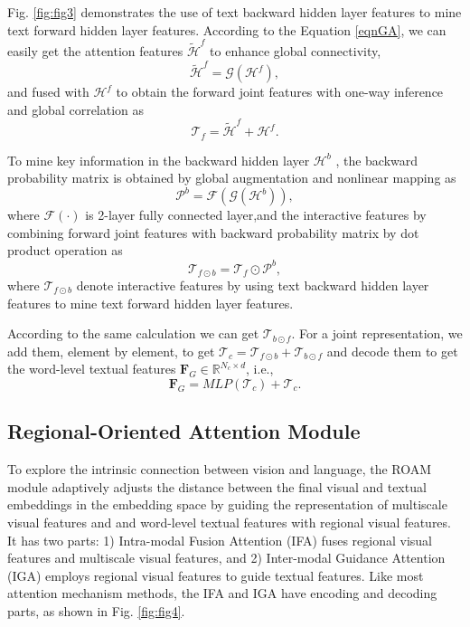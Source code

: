 \documentclass[journal]{IEEEtran}
\begin{document}
Fig. \ref{fig:fig3} demonstrates the use of text backward hidden layer features to mine text forward hidden layer features. According to the Equation \ref{eqnGA}, we can easily get the attention features $\tilde{\bm{\mathcal{H}}}^f$ to enhance global connectivity,
\begin{equation}
\tilde{\bm{\mathcal{H}}}^f = \bm{\mathcal{G}}(\bm{\mathcal{H}}^f),
\end{equation}
and fused with $\bm{\mathcal{H}}^f$ to obtain the forward joint features with one-way inference and global correlation as
\begin{equation}
\bm{\mathcal{T}}_f = \tilde{\bm{\mathcal{H}}}^f + \bm{\mathcal{H}}^f.
\end{equation}

To mine key information in the backward hidden layer $\bm{\mathcal{H}}^b$ , the backward probability matrix is obtained by global augmentation and nonlinear mapping as
\begin{equation}
\bm{\mathcal{P}}^b = \bm{\mathcal{F}}( \bm{\mathcal{G}}(\bm{\mathcal{H}}^b) ),
\end{equation}
where $\bm{\mathcal{F}}(\cdot)$ is 2-layer fully connected layer,and the interactive features by combining forward joint features with backward probability matrix by dot product operation as
\begin{equation}
\bm{\mathcal{T}}_{f\odot b}=\bm{\mathcal{T}}_f \odot \bm{\mathcal{P}}^b,
\end{equation}
where $\bm{\mathcal{T}}_{f\odot b}$ denote interactive features by using text backward hidden layer features to mine text forward hidden layer features.

According to the same calculation we can get $\bm{\mathcal{T}}_{b\odot f}$. For a joint representation, we add them, element by element, to get $\bm{\mathcal{T}}_c = \bm{\mathcal{T}}_{f\odot b}+\bm{\mathcal{T}}_{b\odot f}$ and decode them to get the word-level textual features $\bm{F}_G \in \mathbb{R}^{N_c \times d}$, i.e.,
\begin{equation}
\bm{F}_G =M L P\left(\bm{\mathcal{T}}_c\right) + \bm{\mathcal{T}}_c.
\end{equation}
\subsection{Regional-Oriented Attention Module}\label{sectionAttention}
To explore the intrinsic connection between vision and language, the ROAM module adaptively adjusts the distance between the final visual and textual embeddings in the embedding space by guiding the representation of multiscale visual features and and word-level textual features with regional visual features. It has two parts: 1) Intra-modal Fusion Attention (IFA) fuses regional visual features and multiscale visual features, and 2) Inter-modal Guidance Attention (IGA) employs regional visual features to guide textual features. Like most attention mechanism \cite{bahdanau2014neural} methods, the IFA and IGA have encoding and decoding parts, as shown in Fig. \ref{fig:fig4}.
\end{document}
